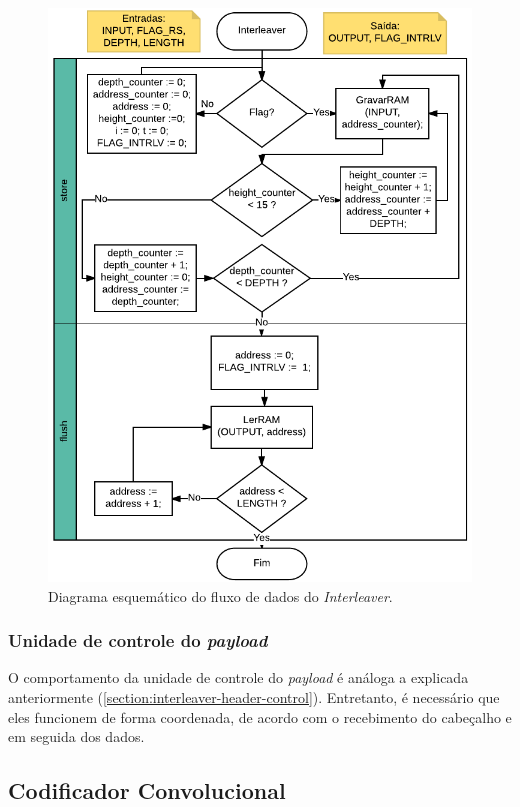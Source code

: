 	\begin{figure}[h]
		\caption{\label{figure:interleaver-flow}Diagrama esquemático do fluxo de dados do \textit{Interleaver}.}
		\centering
		\includegraphics[width=1\textwidth]{interleaver/flow.pdf}
	\end{figure}
	
	\subsubsection{Unidade de controle do \textit{payload}}
	
	O comportamento da unidade de controle do \textit{payload} é análoga a explicada anteriormente (\autoref{section:interleaver-header-control}). Entretanto, é necessário que eles funcionem de forma coordenada, de acordo com o recebimento do cabeçalho e em seguida dos dados.
	
	\subsection{Codificador Convolucional}	
	
